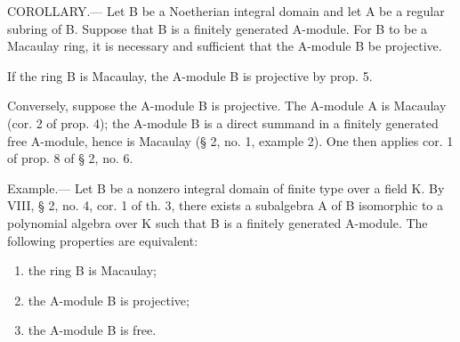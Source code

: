 COROLLARY.--- Let B be a Noetherian integral domain and let A be a regular subring of B. Suppose that B is a finitely generated A-module. For B to be a Macaulay ring, it is necessary and sufficient that the A-module B be projective.

If the ring B is Macaulay, the A-module B is projective by prop. 5.

Conversely, suppose the A-module B is projective. The A-module A is Macaulay (cor. 2 of prop. 4); the A-module B is a direct summand in a finitely generated free A-module, hence is Macaulay (§ 2, no. 1, example 2). One then applies cor. 1 of prop. 8 of § 2, no. 6.

Example.--- Let B be a nonzero integral domain of finite type over a field K. By VIII, § 2, no. 4, cor. 1 of th. 3, there exists a subalgebra A of B isomorphic to a polynomial algebra over K such that B is a finitely generated A-module. The following properties are equivalent:

\begin{enumerate}
\def\labelenumi{(\roman{enumi})}
\item
  the ring B is Macaulay;
\item
  the A-module B is projective;
\item
  the A-module B is free.
\end{enumerate}

